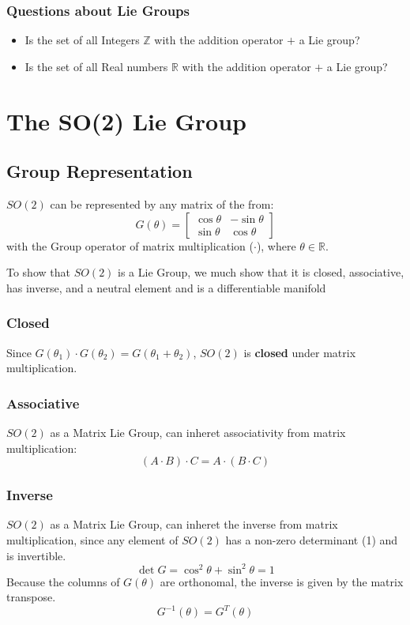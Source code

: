 \documentclass{book}
\begin{document}
\subsection*{Questions about Lie Groups}
\begin{itemize}
    \item Is the set of all Integers $\mathbb{Z}$ with the addition operator $+$ a Lie group?
    \item Is the set of all Real numbers $\mathbb{R}$ with the addition operator $+$ a Lie group?
\end{itemize}


\chapter{The SO(2) Lie Group}
%
\section{Group Representation}
%
$SO(2)$ can be represented by any matrix of the from:
%
$$G(\theta) = \begin{bmatrix}
\cos{\theta} & -\sin{\theta} \\
\sin{\theta} & \cos{\theta}
\end{bmatrix}$$
with the Group operator of matrix multiplication ($\cdot$), where $\theta \in \mathbb{R}$.

To show that $SO(2)$ is a Lie Group, we much show that it is closed, associative, has inverse, and a neutral element and is a differentiable manifold

\subsection*{Closed}
%
Since $G(\theta_1) \cdot G(\theta_2) = G(\theta_1 + \theta_2)$, $SO(2)$ is \textbf{closed} under matrix multiplication.

\subsection*{Associative}
%
$SO(2)$ as a Matrix Lie Group, can inheret associativity from matrix multiplication:
%
$$(A \cdot B) \cdot C = A \cdot (B \cdot C)$$

\subsection*{Inverse}
%
$SO(2)$ as a Matrix Lie Group, can inheret the inverse from matrix multiplication, since any element of $SO(2)$ has a non-zero determinant (1) and is invertible.
%
$$\det{G} = \cos^2{\theta} + \sin^2{\theta} = 1$$
%
Because the columns of $G(\theta)$ are orthonomal, the inverse is given by the matrix transpose.
%
$$G^{-1}(\theta) = G^T(\theta)$$
\end{document}
